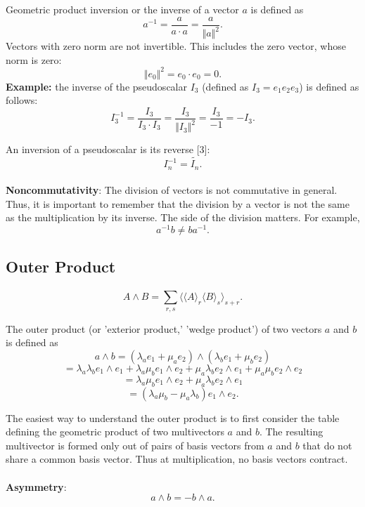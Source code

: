 \documentclass{article}
\begin{document}
Geometric product inversion or the inverse of a vector $a$ is defined as $$a^{-1} = \frac{a}{a \cdot a} = \frac {a}{\Vert{a}\Vert^2}.$$
Vectors with zero norm are not invertible. This includes the zero vector, whose norm is zero:
$$\Vert{e_0}\Vert^2 = e_0 \cdot e_0 = 0.$$
\textbf{Example:} the inverse of the pseudoscalar $I_3$ (defined as $I_3 = e_1 e_2 e_3$) is defined as follows:
$$I_3^{-1} = \frac{I_3}{I_3 \cdot I_3} = \frac {I_3}{\Vert{I_3}\Vert^2} = \frac {I_3}{-1} = -I_3.$$

An inversion of a pseudoscalar is its reverse [3]: $$I_n^{-1} = \tilde{I_n}.$$

\paragraph{}\textbf{Noncommutativity}: The division of vectors is not commutative in general. Thus, it is important to
remember that the division by a vector is not the same as the multiplication by its inverse. The side of the division
matters. For example, $$a^{-1}b \neq ba^{-1}.$$

\subsection{\textbf{Outer Product}}

\paragraph{}
    $$A \wedge B = \sum_{r,s} \langle \langle A \rangle_{r} \langle B \rangle_{s} \rangle_{s + r}.$$
    
The outer product (or 'exterior product,' 'wedge product') of two vectors $a$ and $b$ is defined as 
$$a \wedge b = (\lambda_a e_1 + \mu_a e_2) \wedge (\lambda_b e_1 + \mu_b e_2)$$
$$= \lambda_a \lambda_b e_1 \wedge e_1 + \lambda_a \mu_b e_1 \wedge e_2 + \mu_a \lambda_b e_2 \wedge e_1 + \mu_a \mu_b e_2 \wedge e_2$$
$$= \lambda_a \mu_b e_1 \wedge e_2 + \mu_a \lambda_b e_2 \wedge e_1$$
$$= (\lambda_a \mu_b - \mu_a \lambda_b) e_1 \wedge e_2.$$

The easiest way to understand the outer product is to first consider the table defining the geometric product of two multivectors $a$ and $b$. 
The resulting multivector is formed only out of pairs of basis vectors from $a$ and $b$ that do not share a common basis vector.
Thus at multiplication, no basis vectors contract.

\paragraph{}\textbf{Asymmetry}:
$$a \wedge b = -b \wedge a.$$
\end{document}
